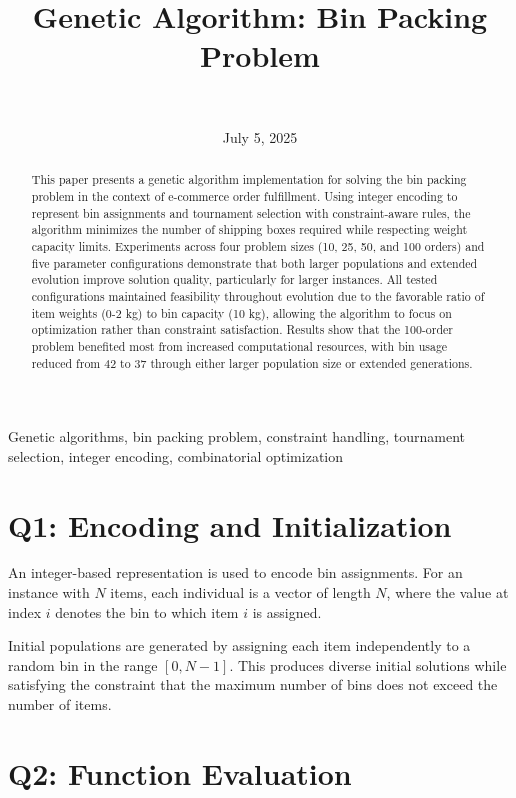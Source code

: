 \documentclass[journal,12pt,onecolumn]{IEEEtran}
\title{Genetic Algorithm: Bin Packing Problem}
\author{
   \IEEEauthorblockN{Matthew D. Branson} \\
   \IEEEauthorblockA{\textit{Department of Computer Science} \\
   \textit{Missouri State University}\\
   Springfield, MO \\
   branson773@live.missouristate.edu
   }
}
\date{July 5, 2025}
\begin{document}
\maketitle

\begin{abstract}
This paper presents a genetic algorithm implementation for solving the bin packing problem in the context of e-commerce order fulfillment. Using integer encoding to represent bin assignments and tournament selection with constraint-aware rules, the algorithm minimizes the number of shipping boxes required while respecting weight capacity limits. Experiments across four problem sizes (10, 25, 50, and 100 orders) and five parameter configurations demonstrate that both larger populations and extended evolution improve solution quality, particularly for larger instances. All tested configurations maintained feasibility throughout evolution due to the favorable ratio of item weights (0-2 kg) to bin capacity (10 kg), allowing the algorithm to focus on optimization rather than constraint satisfaction. Results show that the 100-order problem benefited most from increased computational resources, with bin usage reduced from 42 to 37 through either larger population size or extended generations.
\end{abstract}

\begin{IEEEkeywords}
Genetic algorithms, bin packing problem, constraint handling, tournament selection, integer encoding, combinatorial optimization
\end{IEEEkeywords}

\section{Q1: Encoding and Initialization}

An integer-based representation is used to encode bin assignments. For an instance with $N$ items, each individual is a vector of length $N$, where the value at index $i$ denotes the bin to which item $i$ is assigned.

Initial populations are generated by assigning each item independently to a random bin in the range $[0, N-1]$. This produces diverse initial solutions while satisfying the constraint that the maximum number of bins does not exceed the number of items.

\section{Q2: Function Evaluation}
\end{document}
